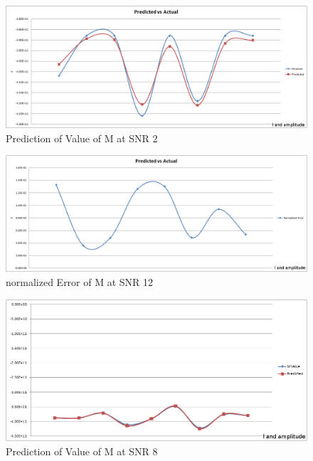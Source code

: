 \begin{figure}
\begin{center}
\includegraphics[scale=0.5]{images/chapter_5/inverse/pred_snr_2.png}
\caption{Prediction of Value of M at SNR 2}
\end{center}
\end{figure}


\begin{figure}
\begin{center}
\includegraphics[scale=0.5]{images/chapter_5/inverse/error_snr_2.png}
\caption{normalized Error of M at SNR 12}
\end{center}
\end{figure}


\begin{figure}
\begin{center}
\includegraphics[scale=0.5]{images/chapter_5/inverse/pred_snr_8.png}
\caption{Prediction of Value of M at SNR 8}
\end{center}
\end{figure}


